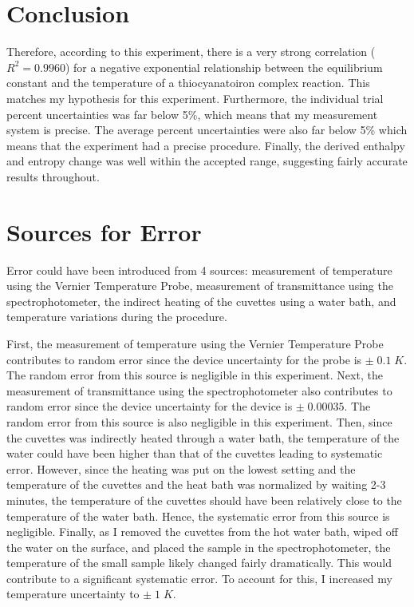 \section{Conclusion}
Therefore, according to this experiment, there is a very strong correlation (\(R^2=0.9960\)) for a negative exponential relationship between the equilibrium constant and the temperature of a thiocyanatoiron complex reaction.
This matches my hypothesis for this experiment. Furthermore, the individual trial percent uncertainties was far below 5\%, which means that my measurement system is precise. The average percent uncertainties were also far below 5\% which means that the experiment had a precise procedure. Finally, the derived enthalpy and entropy change was well within the accepted range, suggesting fairly accurate results throughout.

\section{Sources for Error}
Error could have been introduced from 4 sources: measurement of temperature using the Vernier Temperature Probe, measurement of transmittance using the spectrophotometer, the indirect heating of the cuvettes using a water bath, and temperature variations during the procedure.

First, the measurement of temperature using the Vernier Temperature Probe contributes to random error since the device uncertainty for the probe is \(\pm\;0.1 \; K\). The random error from this source is negligible in this experiment. Next, the measurement of transmittance using the spectrophotometer also contributes to random error since the device uncertainty for the device is \(\pm\;0.00035\). The random error from this source is also negligible in this experiment. Then, since the cuvettes was indirectly heated through a water bath, the temperature of the water could have been higher than that of the cuvettes leading to systematic error. However, since the heating was put on the lowest setting and the temperature of the cuvettes and the heat bath was normalized by waiting 2-3 minutes, the temperature of the cuvettes should have been relatively close to the temperature of the water bath. Hence, the systematic error from this source is negligible. Finally, as I removed the cuvettes from the hot water bath, wiped off the water on the surface, and placed the sample in the spectrophotometer, the temperature of the small sample likely changed fairly dramatically. This would contribute to a significant systematic error. To account for this, I increased my temperature uncertainty to \(\pm\;1\; K\).

